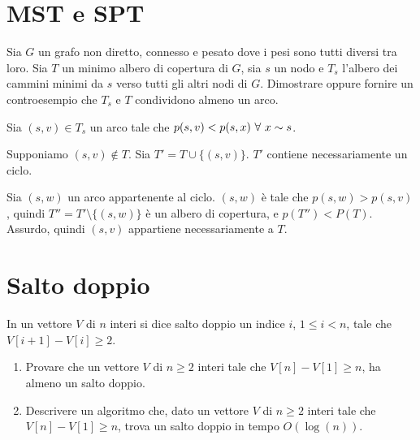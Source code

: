 
\usepackage{algorithm}
\usepackage{algpseudocode}

\renewcommand{\algorithmicrequire}{\textbf{precondizioni:}}



\setcounter{chapter}{1}

\section{MST e SPT}

\begin{esercizio}
Sia $G$ un grafo non diretto, connesso e pesato dove i pesi sono tutti diversi tra loro. Sia $T$ un minimo albero di copertura di $G$, sia $s$ un nodo e $T_s$ l'albero dei cammini minimi da $s$ verso tutti gli altri nodi di $G$. Dimostrare oppure fornire un controesempio che $T_s$ e $T$ condividono almeno un arco.
\end{esercizio}

Sia $(s,v) \in T_s$ un arco tale che $p(s,v) < p(s,x) \forall x \adj s$.

Supponiamo $(s,v) \notin T$. Sia $T' = T \cup \{(s,v)\}$. $T'$ contiene necessariamente un ciclo.

Sia $(s,w)$ un arco appartenente al ciclo. $(s,w)$ \`e tale che $p(s,w) > p(s,v)$, quindi $T'' = T' \setminus \{ (s,w) \}$ \`e un albero di copertura, e $p(T'') < P(T)$. Assurdo, quindi $(s,v)$ appartiene necessariamente a $T$.

\clearpage

\section{Salto doppio}

\begin{esercizio}
In un vettore $V$ di $n$ interi si dice salto doppio un indice $i$, $1 \le i < n$, tale che $V[i + 1] - V[i] \ge 2$.
\begin{enumerate}
    \item Provare che un vettore $V$ di $n \ge 2$ interi tale che $V[n]-V[1] \ge n$, ha almeno un salto doppio.
    \item Descrivere un algoritmo che, dato un vettore $V$ di $n \ge 2$ interi tale che $V[n] - V[1] \ge n$, trova un salto doppio in tempo $O\left(\log (n)\right)$.
\end{enumerate}
\end{esercizio}


